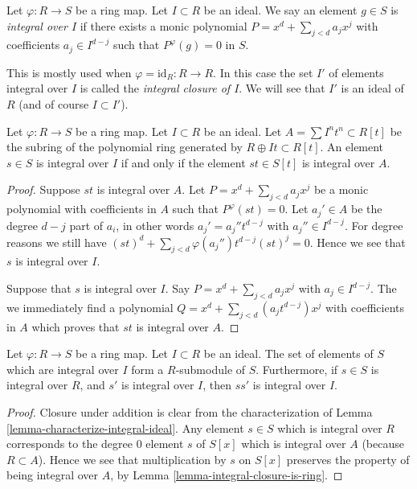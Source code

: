 \begin{definition}
\label{definition-integral-over-ideal}
Let $\varphi : R\to S$ be a ring map.
Let $I \subset R$ be an ideal.
We say an element $g \in S$ is
{\it integral over $I$} if
there exists a monic
polynomial $P = x^d + \sum_{j < d} a_j x^j$
with coefficients $a_j \in I^{d-j}$ such
that $P^\varphi(g) = 0$ in $S$.
\end{definition}

\noindent
This is mostly used when $\varphi = \text{id}_R : R \to R$.
In this case the set $I'$ of elements integral over $I$ is called
the {\it integral closure of $I$}. We will see that $I'$ is
an ideal of $R$ (and of course $I \subset I'$).

\begin{lemma}
\label{lemma-characterize-integral-ideal}
Let $\varphi : R \to S$ be a ring map.
Let $I \subset R$ be an ideal.
Let $A = \sum I^nt^n \subset R[t]$ be the
subring of the polynomial ring
generated by $R \oplus It \subset R[t]$.
An element $s \in S$ is integral over $I$ if
and only if the element $st \in S[t]$
is integral over $A$.
\end{lemma}

\begin{proof}
Suppose $st$ is integral over $A$.
Let $P = x^d + \sum_{j < d} a_j x^j$
be a monic polynomial with coefficients in $A$
such that $P^\varphi(st) = 0$. Let $a_j' \in A$
be the degree $d-j$ part of $a_i$, in other
words $a_j' = a_j'' t^{d-j}$ with $a_j'' \in I^{d-j}$.
For degree reasons we still have
$(st)^d + \sum_{j < d} \varphi(a_j'') t^{d-j} (st)^j = 0$.
Hence we see that $s$ is integral over $I$.

\medskip\noindent
Suppose that $s$ is integral over $I$.
Say $P = x^d + \sum_{j < d} a_j x^j$
with $a_j \in I^{d-j}$. The we immediately find a
polynomial $Q = x^d + \sum_{j < d} (a_j t^{d-j}) x^j$
with coefficients in $A$ which proves that
$st$ is integral over $A$.
\end{proof}

\begin{lemma}
\label{lemma-integral-over-ideal-is-submodule}
Let $\varphi : R \to S$ be a ring map.
Let $I \subset R$ be an ideal.
The set of elements of $S$ which are integral
over $I$ form a $R$-submodule of $S$.
Furthermore, if $s \in S$ is integral over
$R$, and $s'$ is integral over $I$, then
$ss'$ is integral over $I$.
\end{lemma}

\begin{proof}
Closure under addition is clear from the
characterization of Lemma \ref{lemma-characterize-integral-ideal}.
Any element $s \in S$ which is integral over
$R$ corresponds to the degree $0$ element $s$ of $S[x]$
which is integral over $A$ (because $R \subset A$).
Hence we see that multiplication by $s$ on $S[x]$
preserves the property of being integral over $A$,
by Lemma \ref{lemma-integral-closure-is-ring}.
\end{proof}

